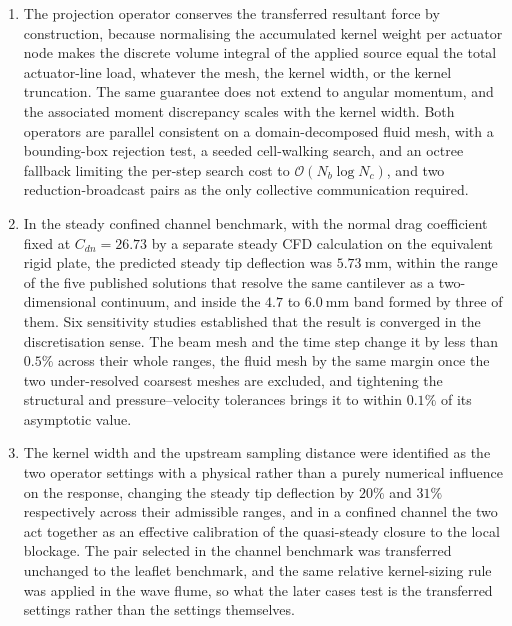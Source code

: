 \begin{enumerate}[leftmargin=*]

\item The projection operator conserves the transferred resultant force by construction, because normalising the accumulated kernel weight per actuator node makes the discrete volume integral of the applied source equal the total actuator-line load, whatever the mesh, the kernel width, or the kernel truncation. The same guarantee does not extend to angular momentum, and the associated moment discrepancy scales with the kernel width. Both operators are parallel consistent on a domain-decomposed fluid mesh, with a bounding-box rejection test, a seeded cell-walking search, and an octree fallback limiting the per-step search cost to $\mathcal{O}(N_{b}\log N_{c})$, and two reduction-broadcast pairs as the only collective communication required.

\item In the steady confined channel benchmark, with the normal drag coefficient fixed at $C_{dn} = 26.73$ by a separate steady CFD calculation on the equivalent rigid plate, the predicted steady tip deflection was $5.73~\mathrm{mm}$, within the range of the five published solutions that resolve the same cantilever as a two-dimensional continuum, and inside the $4.7$ to $6.0~\mathrm{mm}$ band formed by three of them. Six sensitivity studies established that the result is converged in the discretisation sense. The beam mesh and the time step change it by less than $0.5\%$ across their whole ranges, the fluid mesh by the same margin once the two under-resolved coarsest meshes are excluded, and tightening the structural and pressure--velocity tolerances brings it to within $0.1\%$ of its asymptotic value.

\item The kernel width and the upstream sampling distance were identified as the two operator settings with a physical rather than a purely numerical influence on the response, changing the steady tip deflection by $20\%$ and $31\%$ respectively across their admissible ranges, and in a confined channel the two act together as an effective calibration of the quasi-steady closure to the local blockage. The pair selected in the channel benchmark was transferred unchanged to the leaflet benchmark, and the same relative kernel-sizing rule was applied in the wave flume, so what the later cases test is the transferred settings rather than the settings themselves.


\end{enumerate}
